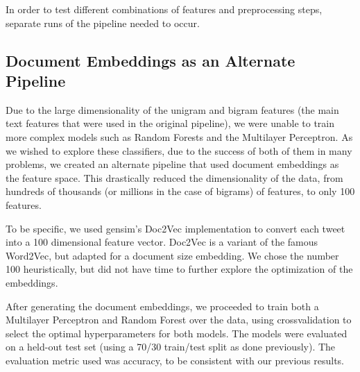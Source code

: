 \documentclass[11pt]{article}
\begin{document}
In order to test different combinations of features and preprocessing steps, separate runs of the pipeline needed to occur.

\subsection{Document Embeddings as an Alternate Pipeline}
\label{subsec:altpipe}

Due to the large dimensionality of the unigram and bigram features (the main text features that were used in the original pipeline), we were unable to train more complex models such as Random Forests and the Multilayer Perceptron. As we wished to explore these classifiers, due to the success of both of them in many problems, we created an alternate pipeline that used document embeddings as the feature space. This drastically reduced the dimensionality of the data, from hundreds of thousands (or millions in the case of bigrams) of features, to only 100 features.

To be specific, we used gensim's Doc2Vec implementation to convert each tweet into a 100 dimensional feature vector. Doc2Vec is a variant of the famous Word2Vec, but adapted for a document size embedding. We chose the number 100 heuristically, but did not have time to further explore the optimization of the embeddings.

After generating the document embeddings, we proceeded to train both a Multilayer Perceptron and Random Forest over the data, using crossvalidation to select the optimal hyperparameters for both models. The models were evaluated on a held-out test set (using a 70/30 train/test split as done previously). The evaluation metric used was accuracy, to be consistent with our previous results.
\end{document}
